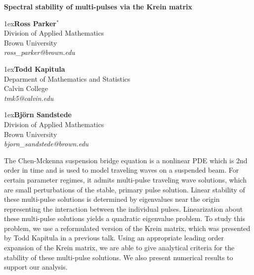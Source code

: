 \documentclass[12pt]{article}
\def\title#1{{\large\bf #1}}
\def\author#1#2#3{\vglue1ex{\bf #1}\\[0.4ex]{\small #2}\\[0.2ex]\textit{\small #3}}
\begin{document}
\pagestyle{empty}
\begin{center}


\title{Spectral stability of multi-pulses via the Krein matrix}

\author{Ross Parker$^*$}
  {Division of Applied Mathematics\\Brown University}
  {ross\_parker@brown.edu} 

\author{Todd Kapitula}
  {Deparment of Mathematics and Statistics\\Calvin College}
  {tmk5@calvin.edu}

\author{Bj{\"o}rn Sandstede}
  {Division of Applied Mathematics\\Brown University}
  {bjorn\_sandstede@brown.edu}

\end{center}

\abstract

The Chen-Mckenna suspension bridge equation is a nonlinear PDE which is 2nd order in time and is used to model traveling waves on a suspended beam. For certain parameter regimes, it admits multi-pulse traveling wave solutions, which are small perturbations of the stable, primary pulse solution. Linear stability of these multi-pulse solutions is determined by eigenvalues near the origin representing the interaction between the individual pulses. Linearization about these multi-pulse solutions yields a quadratic eigenvalue problem. To study this problem, we use a reformulated version of the Krein matrix, which was presented by Todd Kapitula in a previous talk. Using an appropriate leading order expansion of the Krein matrix, we are able to give analytical criteria for the stability of these multi-pulse solutions. We also present numerical results to support our analysis. 
\end{document}

